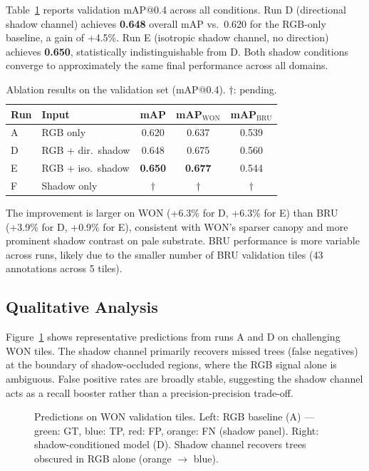 \documentclass[10pt,twocolumn]{article}
\begin{document}
Table~\ref{tab:ablation} reports validation mAP@0.4 across all conditions.
Run D (directional shadow channel) achieves \textbf{0.648} overall mAP vs.\
0.620 for the RGB-only baseline, a gain of +4.5\%. Run E (isotropic shadow
channel, no direction) achieves \textbf{0.650}, statistically indistinguishable
from D. Both shadow conditions converge to approximately the same final
performance across all domains.

\begin{table}[h]
  \centering
  \caption{Ablation results on the validation set (mAP@0.4).
           $\dagger$: pending.}
  \label{tab:ablation}
  \small
  \begin{tabular}{llccc}
    \toprule
    Run & Input & mAP & mAP$_{\text{WON}}$ & mAP$_{\text{BRU}}$ \\
    \midrule
    A & RGB only          & 0.620 & 0.637 & 0.539 \\
    D & RGB + dir.\ shadow  & 0.648 & 0.675 & 0.560 \\
    E & RGB + iso.\ shadow  & \textbf{0.650} & \textbf{0.677} & 0.544 \\
    F & Shadow only        & $\dagger$ & $\dagger$ & $\dagger$ \\
    \bottomrule
  \end{tabular}
\end{table}

The improvement is larger on WON (+6.3\% for D, +6.3\% for E) than BRU
(+3.9\% for D, +0.9\% for E), consistent with WON's sparser canopy and
more prominent shadow contrast on pale substrate. BRU performance is more
variable across runs, likely due to the smaller number of BRU validation
tiles (43 annotations across 5 tiles).

\subsection{Qualitative Analysis}

Figure~\ref{fig:qual} shows representative predictions from runs A and D
on challenging WON tiles. The shadow channel primarily recovers missed trees
(false negatives) at the boundary of shadow-occluded regions, where the RGB
signal alone is ambiguous. False positive rates are broadly stable, suggesting
the shadow channel acts as a recall booster rather than a precision-precision
trade-off.

\begin{figure}[t]
  \centering
  \fbox{\rule{0pt}{5cm}\rule{\linewidth}{0pt}}
  \caption{Predictions on WON validation tiles. Left: RGB baseline (A) ---
           green: GT, blue: TP, red: FP, orange: FN (shadow panel).
           Right: shadow-conditioned model (D). Shadow channel recovers
           trees obscured in RGB alone (orange $\to$ blue).}
  \label{fig:qual}
\end{figure}
\end{document}
